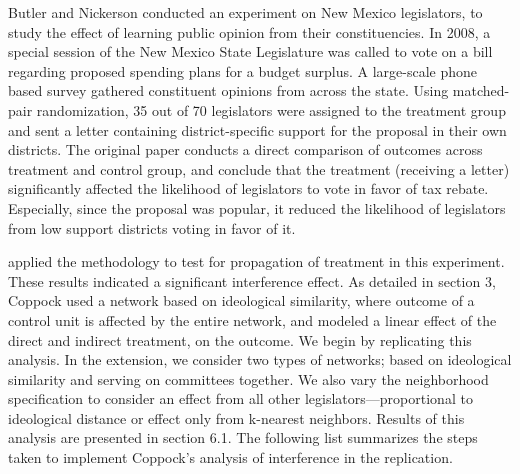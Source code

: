 \documentclass[12pt]{article}
\begin{document}
Butler and Nickerson conducted an experiment on New Mexico legislators, to study the effect of learning public opinion from their constituencies. In 2008, a special session of the New Mexico State Legislature was called to vote on a bill regarding proposed spending plans for a budget surplus. A large-scale phone based survey gathered constituent opinions from across the state. Using matched-pair randomization, 35 out of 70 legislators were assigned to the treatment group and sent a letter containing district-specific support for the proposal in their own districts. The original paper conducts a direct comparison of outcomes across treatment and control group, and conclude that the treatment (receiving a letter) significantly affected the likelihood of legislators to vote in favor of tax rebate. Especially, since the proposal was popular, it reduced the likelihood of legislators from low support districts voting in favor of it. 

\citet{coppock2014information} applied the \citet{bowers2012reasoning} methodology to test for propagation of treatment in this experiment. These results indicated a significant interference effect. As detailed in section 3, Coppock used a network based on ideological similarity, where outcome of a control unit is affected by the entire network, and modeled a linear effect of the direct and indirect treatment, on the outcome. We begin by replicating this analysis. In the extension, we consider two types of networks; based on ideological similarity and serving on committees together. We also vary the neighborhood specification to consider an effect from all other legislators---proportional to ideological distance or effect only from k-nearest neighbors. Results of this analysis are presented in section 6.1. The following list summarizes the steps taken to implement Coppock's analysis of interference in the \citet{butler2011can} replication.
\end{document}
